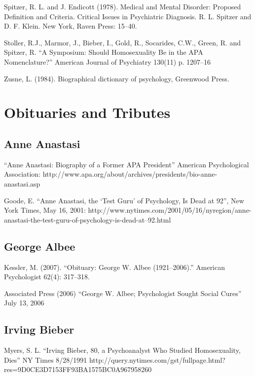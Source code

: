 Spitzer, R. L. and J. Endicott (1978). Medical and Mental Disorder: Proposed Definition and Criteria. Critical Issues in Psychiatric Diagnosis. R. L. Spitzer and D. F. Klein. New York, Raven Press: 15--40.

Stoller, R.J., Marmor, J., Bieber, I., Gold, R., Socarides, C.W., Green, R. and Spitzer, R. ``A Symposium: Should Homosexuality Be in the APA Nomenclature?'' American Journal of Psychiatry 130(11) p. 1207--16

Zusne, L. (1984). Biographical dictionary of psychology, Greenwood Press.

\section{Obituaries and Tributes}
\label{obituariesandtributes}

\subsection{Anne Anastasi}
\label{anneanastasi}

``Anne Anastasi: Biography of a Former APA President'' American Psychological Association: http:\slash \slash www.apa.org\slash about\slash archives\slash presidents\slash bio-anne-anastasi.asp

Goode, E. ``Anne Anastasi, the `Test Guru' of Psychology, Is Dead at 92'', New York Times, May 16, 2001: http:\slash \slash www.nytimes.com\slash 2001\slash 05\slash 16\slash nyregion\slash anne-anastasi-the-test-guru-of-psychology-is-dead-at--92.html 

\subsection{George Albee}
\label{georgealbee}

Kessler, M. (2007). ``Obituary: George W. Albee (1921--2006).'' American Psychologist 62(4): 317--318. 

Associated Press (2006) ``George W. Albee; Psychologist Sought Social Cures'' July 13, 2006

\subsection{Irving Bieber}
\label{irvingbieber}

Myers, S. L. ``Irving Bieber, 80, a Psychoanalyst Who Studied Homosexuality, Dies'' NY Times 8\slash 28\slash 1991 http:\slash \slash query.nytimes.com\slash gst\slash fullpage.html?res=9D0CE3D7153FF93BA1575BC0A967958260


